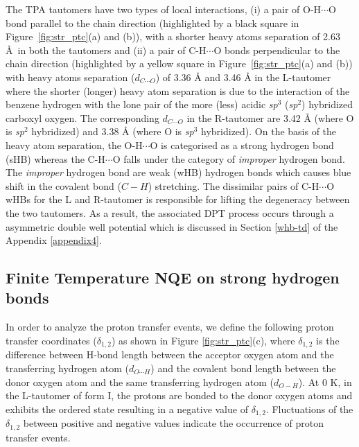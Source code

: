 The TPA tautomers have two types of local interactions, (i) a pair of O-H$\cdots$O bond parallel to the chain direction (highlighted by a black square in Figure~\ref{fig:str_ptc}(a) and (b)), with a shorter heavy atoms separation of 2.63 \AA~in both the tautomers and (ii) a pair of C-H$\cdots$O bonds\cite{gu1999fundamental} perpendicular to the chain direction (highlighted by a yellow square in Figure~\ref{fig:str_ptc}(a) and (b)) with heavy atoms separation ($d_{C\cdots O}$) of 3.36 \AA{}  and 3.46 \AA{} in the L-tautomer where the shorter (longer) heavy atom separation is due to the interaction of the benzene hydrogen with the lone pair of the more (less) acidic \textit{sp$^3$} (\textit{sp$^2$}) hybridized carboxyl oxygen. The corresponding $d_{C\cdots O}$ in the R-tautomer are 3.42 \AA{} (where O is \textit{sp$^2$} hybridized) and 3.38 \AA{} (where O is \textit{sp$^3$} hybridized). On the basis of the heavy atom separation\cite{arunan2011definition,desiraju2001weak}, the O-H$\cdots$O is categorised as a strong hydrogen bond (sHB) whereas the C-H$\cdots$O falls under the category of \emph{improper} hydrogen bond. The \emph{improper\cite{van2001nature}} hydrogen bond are weak (wHB) hydrogen bonds which causes blue shift in the covalent bond ($C-H$) stretching. The dissimilar pairs of C-H$\cdots$O wHBs for the L and R-tautomer is responsible for lifting the degeneracy between the two tautomers. As a result, the associated DPT process occurs through a asymmetric double well potential which is discussed in Section \ref{whb-td} of the Appendix \ref{appendix4}.


\subsection{Finite Temperature NQE on strong hydrogen bonds} 

In order to analyze the proton transfer events, we define the following proton transfer coordinates ($\delta_{1,2}$) as shown in Figure \ref{fig:str_ptc}(c), where $\delta_{1,2}$ is the difference
between H-bond length between the acceptor oxygen atom and the transferring hydrogen atom ($d_{O\cdots H}$) and the covalent bond length between the donor oxygen atom and the same transferring hydrogen atom ($d_{O-H}$). At 0 K, in the L-tautomer of form I, the protons are bonded to the donor oxygen atoms and exhibits the ordered state resulting in a negative value of $\delta_{1,2}$. Fluctuations of the $\delta_{1,2}$ between positive and negative values indicate the occurrence of proton transfer events. 


